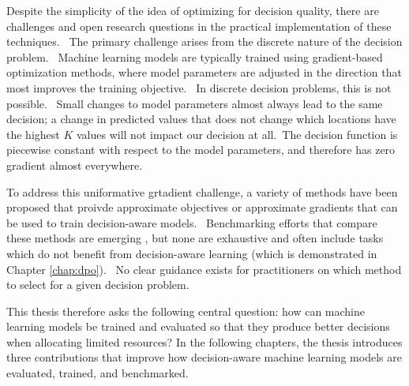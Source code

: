 Despite the simplicity of the idea of optimizing for decision quality, there are challenges and open research questions in the practical implementation of these techniques. \
The primary challenge arises from the discrete nature of the decision problem. \
Machine learning models are typically trained using gradient-based optimization methods, where model parameters are adjusted in the direction that most improves the training objective. \
In discrete decision problems, this is not possible. \
Small changes to model parameters almost always lead to the same decision; a change in predicted values that does not change which locations have the highest $K$ values will not impact our decision at all.\
The decision function is piecewise constant with respect to the model parameters, and therefore has zero gradient almost everywhere. \

To address this uniformative grtadient challenge, a variety of methods have been proposed that proivde approximate objectives or approximate gradients that can be used to train decision-aware models. \
Benchmarking efforts that compare these methods are emerging \citep{gengBenchmarkingPtOPnO2024,shahLeavingNestGoing2023,tangPyEPOPyTorchbasedEndtoend2024}, but none are exhaustive and often include tasks which do not benefit from decision-aware learning (which is demonstrated in Chapter \ref{chap:dpo}). \
No clear guidance exists for practitioners on which method to select for a given decision problem. \

This thesis therefore asks the following central question: how can machine learning models be trained and evaluated so that they produce better decisions when allocating limited resources?
In the following chapters, the thesis introduces three contributions that improve how decision-aware machine learning models are evaluated, trained, and benchmarked.


